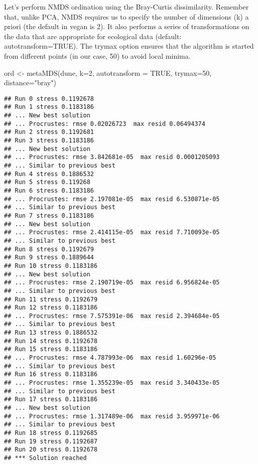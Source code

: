 \documentclass[
]{book}
\newenvironment{Shaded}{\begin{snugshade}}{\end{snugshade}}
\newcommand{\AttributeTok}[1]{\textcolor[rgb]{0.77,0.63,0.00}{#1}}
\newcommand{\ConstantTok}[1]{\textcolor[rgb]{0.00,0.00,0.00}{#1}}
\newcommand{\DecValTok}[1]{\textcolor[rgb]{0.00,0.00,0.81}{#1}}
\newcommand{\FunctionTok}[1]{\textcolor[rgb]{0.00,0.00,0.00}{#1}}
\newcommand{\NormalTok}[1]{#1}
\newcommand{\OtherTok}[1]{\textcolor[rgb]{0.56,0.35,0.01}{#1}}
\newcommand{\StringTok}[1]{\textcolor[rgb]{0.31,0.60,0.02}{#1}}
\begin{document}
Let's perform NMDS ordination using the Bray-Curtis dissimilarity. Remember that, unlike PCA, NMDS requires us to specify the number of dimensions (k) a priori (the default in vegan is 2). It also performs a series of transformations on the data that are appropriate for ecological data (default: autotransform=TRUE). The trymax option ensures that the algorithm is started from different points (in our case, 50) to avoid local minima.

\begin{Shaded}
\begin{Highlighting}[]
\NormalTok{ord }\OtherTok{\textless{}{-}} \FunctionTok{metaMDS}\NormalTok{(dune, }\AttributeTok{k=}\DecValTok{2}\NormalTok{, }\AttributeTok{autotransform =} \ConstantTok{TRUE}\NormalTok{, }\AttributeTok{trymax=}\DecValTok{50}\NormalTok{, }\AttributeTok{distance=}\StringTok{"bray"}\NormalTok{)}
\end{Highlighting}
\end{Shaded}

\begin{verbatim}
## Run 0 stress 0.1192678 
## Run 1 stress 0.1183186 
## ... New best solution
## ... Procrustes: rmse 0.02026723  max resid 0.06494374 
## Run 2 stress 0.1192681 
## Run 3 stress 0.1183186 
## ... New best solution
## ... Procrustes: rmse 3.842681e-05  max resid 0.0001205093 
## ... Similar to previous best
## Run 4 stress 0.1886532 
## Run 5 stress 0.119268 
## Run 6 stress 0.1183186 
## ... Procrustes: rmse 2.197081e-05  max resid 6.530871e-05 
## ... Similar to previous best
## Run 7 stress 0.1183186 
## ... New best solution
## ... Procrustes: rmse 2.414115e-05  max resid 7.710093e-05 
## ... Similar to previous best
## Run 8 stress 0.1192679 
## Run 9 stress 0.1889644 
## Run 10 stress 0.1183186 
## ... New best solution
## ... Procrustes: rmse 2.190719e-05  max resid 6.956824e-05 
## ... Similar to previous best
## Run 11 stress 0.1192679 
## Run 12 stress 0.1183186 
## ... Procrustes: rmse 7.575391e-06  max resid 2.394684e-05 
## ... Similar to previous best
## Run 13 stress 0.1886532 
## Run 14 stress 0.1192678 
## Run 15 stress 0.1183186 
## ... Procrustes: rmse 4.787993e-06  max resid 1.60296e-05 
## ... Similar to previous best
## Run 16 stress 0.1183186 
## ... Procrustes: rmse 1.355239e-05  max resid 3.340433e-05 
## ... Similar to previous best
## Run 17 stress 0.1183186 
## ... New best solution
## ... Procrustes: rmse 1.317489e-06  max resid 3.959971e-06 
## ... Similar to previous best
## Run 18 stress 0.1192685 
## Run 19 stress 0.1192687 
## Run 20 stress 0.1192678 
## *** Solution reached
\end{verbatim}
\end{document}
